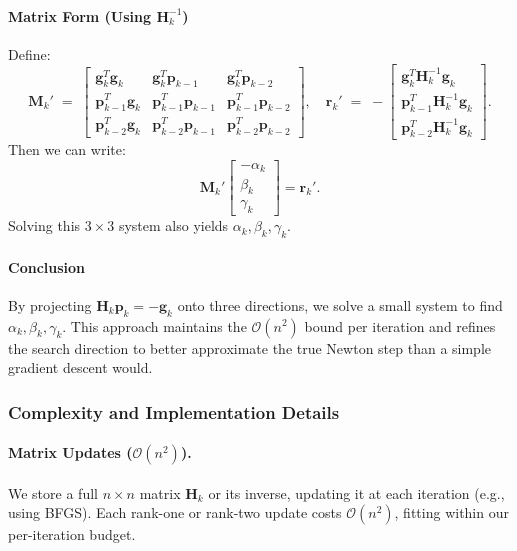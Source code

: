 \documentclass[12pt]{article}
\begin{document}
\paragraph{Matrix Form (Using \(\mathbf{H}_k^{-1}\))}
Define:
\[
\mathbf{M}_k' \;=\;
\begin{bmatrix}
\mathbf{g}_k^T \mathbf{g}_k & \mathbf{g}_k^T  \mathbf{p}_{k-1} & \mathbf{g}_k^T \mathbf{p}_{k-2} \\[6pt]
\mathbf{p}_{k-1}^T \mathbf{g}_k & \mathbf{p}_{k-1}^T \mathbf{p}_{k-1} & \mathbf{p}_{k-1}^T \mathbf{p}_{k-2} \\[6pt]
\mathbf{p}_{k-2}^T \mathbf{g}_k & \mathbf{p}_{k-2}^T  \mathbf{p}_{k-1} & \mathbf{p}_{k-2}^T  \mathbf{p}_{k-2}
\end{bmatrix},
\quad
\mathbf{r}_k'\;=\;
-\begin{bmatrix}
\mathbf{g}_k^T \mathbf{H}_k^{-1} \mathbf{g}_k \\[2pt]
\mathbf{p}_{k-1}^T \mathbf{H}_k^{-1} \mathbf{g}_k \\[2pt]
\mathbf{p}_{k-2}^T \mathbf{H}_k^{-1} \mathbf{g}_k
\end{bmatrix}.
\]
Then we can write:
\[
\mathbf{M}_k'
\begin{bmatrix}
-\alpha_k \\ \beta_k \\ \gamma_k
\end{bmatrix}
=
\mathbf{r}_k'.
\]
Solving this \(3 \times 3\) system also yields \(\alpha_k, \beta_k, \gamma_k\).

\paragraph{Conclusion}
By projecting \(\mathbf{H}_k \mathbf{p}_k = -\mathbf{g}_k\) onto three directions, we solve a small system to find \(\alpha_k, \beta_k, \gamma_k\). This approach maintains the \(\mathcal{O}(n^2)\) bound per iteration and refines the search direction to better approximate the true Newton step than a simple gradient descent would.


\subsubsection{Complexity and Implementation Details}

\paragraph{Matrix Updates (\(\mathcal{O}(n^2)\)).}
We store a full \(n \times n\) matrix \(\mathbf{H}_k\) or its inverse, updating it at each iteration (e.g., using BFGS). Each rank-one or rank-two update costs \(\mathcal{O}(n^2)\), fitting within our per-iteration budget.
\end{document}
